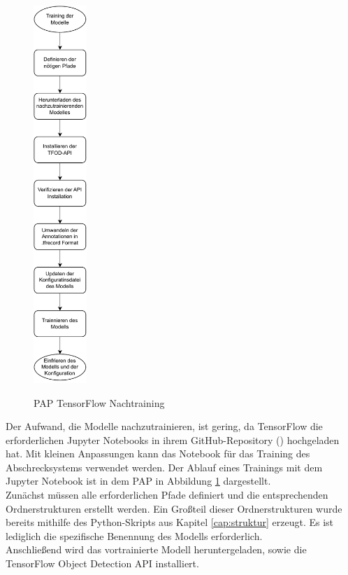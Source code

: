 \begin{figure}
    \centering
    \includegraphics[width=0.18\textwidth]{images/pap_train_tensorflow.pdf}
    \label{fig:tens-pap}
    \caption{\acs*{PAP} TensorFlow Nachtraining}
\end{figure}

Der Aufwand, die Modelle nachzutrainieren, ist gering, da TensorFlow die erforderlichen Jupyter Notebooks in ihrem GitHub-Repository (\cite{tens_zoo}) hochgeladen hat. Mit kleinen Anpassungen kann das Notebook für das Training des Abschrecksystems verwendet werden. Der Ablauf eines Trainings mit dem Jupyter Notebook ist in dem \ac{PAP} in Abbildung \ref{fig:tens-pap} dargestellt.
\\
Zunächst müssen alle erforderlichen Pfade definiert und die entsprechenden Ordnerstrukturen erstellt werden. Ein Großteil dieser Ordnerstrukturen wurde bereits mithilfe des Python-Skripts aus Kapitel \ref{cap:struktur} erzeugt. Es ist lediglich die spezifische Benennung des Modells erforderlich.
\\
Anschließend wird das vortrainierte Modell heruntergeladen, sowie die TensorFlow Object Detection API installiert.

